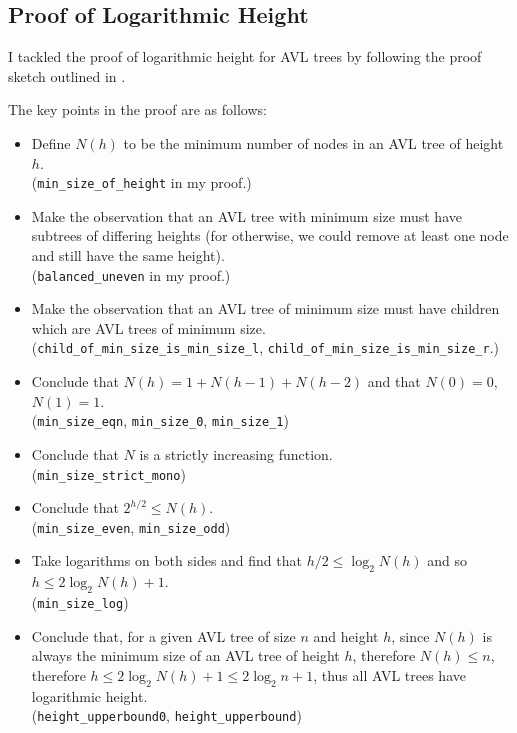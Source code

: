 \documentclass[acmsmall, authorversion, nonacm, overload]{acmart}
\begin{document}
\subsection{Proof of Logarithmic Height}

I tackled the proof of logarithmic height for AVL trees by following the proof sketch
outlined in
{\cite{AVL-height-proof}}.

The key points in the proof are as follows:
\begin{itemize}
\item Define $N(h)$ to be the minimum number of nodes in an AVL tree of height $h$.\\
  (\verb|min_size_of_height| in my proof.)
\item Make the observation that
  an AVL tree with minimum size must have subtrees of differing heights
  (for otherwise, we could remove at least one node and still have the same height).\\
  (\verb|balanced_uneven| in my proof.)
\item Make the observation that an AVL tree of minimum size
  must have children which are AVL trees of minimum size.\\
  (\verb|child_of_min_size_is_min_size_l|, \verb|child_of_min_size_is_min_size_r|.)
\item Conclude that $N(h) = 1 + N(h - 1) + N(h - 2)$
  and that $N(0) = 0$, $N(1) = 1$.\\
  (\verb|min_size_eqn|, \verb|min_size_0|, \verb|min_size_1|)
\item Conclude that $N$ is a strictly increasing function.\\
  (\verb|min_size_strict_mono|)
\item Conclude that $2^{h/2} \le N(h)$.\\
  (\verb|min_size_even|, \verb|min_size_odd|)
\item Take logarithms on both sides and find that $h/2 \le \log_2 N(h)$
  and so $h \le 2\log_2 N(h) + 1$.\\
  (\verb|min_size_log|)
\item Conclude that,
  for a given AVL tree of size $n$ and height $h$,
  since $N(h)$ is always the minimum size of an AVL tree of height $h$,
  therefore $N(h) \le n$, therefore
  $h \le 2\log_2 N(h) + 1 \le 2\log_2 n + 1$,
  thus all AVL trees have logarithmic height.\\
  (\verb|height_upperbound0|, \verb|height_upperbound|)
\end{itemize}
\end{document}
